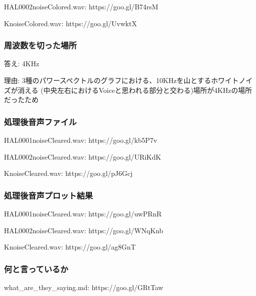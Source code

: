 \documentclass[11pt,a4paper, uplatex]{jsarticle}
\begin{document}
HAL0002noiseColored.wav: https://goo.gl/B74rsM

KnoiseColored.wav: https://goo.gl/UvwktX
%
\subsubsection{周波数を切った場所}
答え: 4KHz

理由: 3種のパワースペクトルのグラフにおける、10KHzを山とするホワイトノイズが消える
(中央左右におけるVoiceと思われる部分と交わる)場所が4KHzの場所だったため
%
\subsubsection{処理後音声ファイル}
HAL0001noiseCleared.wav: https://goo.gl/kb5P7v

HAL0002noiseCleared.wav: https://goo.gl/URiKdK

KnoiseCleared.wav: https://goo.gl/pJ6Gcj
%
\subsubsection{処理後音声プロット結果}
HAL0001noiseCleared.wav: https://goo.gl/uwPRnR

HAL0002noiseCleared.wav: https://goo.gl/WNqKnb

KnoiseCleared.wav: https://goo.gl/ag8GnT
%

\subsubsection{何と言っているか}
what_are_they_saying.md: https://goo.gl/GRtTaw
\end{document}
